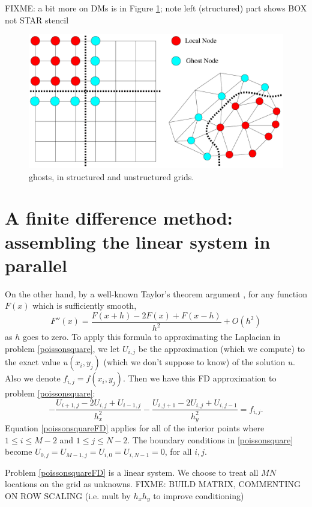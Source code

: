 FIXME: a bit more on DMs is in Figure \ref{fig:petscghostvalues}; note left (structured) part shows BOX not STAR stencil

\begin{figure}
\includegraphics[width=\textwidth]{petscghostvalues}
\caption{\PETSc ghosts, in structured and unstructured grids.}
\label{fig:petscghostvalues}
\end{figure}


\section{A finite difference method: assembling the linear system in parallel}

On the other hand, by a well-known Taylor's theorem argument \citep{MortonMayers}, for any function $F(x)$ which is sufficiently smooth,
    $$F''(x) = \frac{F(x+h) - 2 F(x) + F(x-h)}{h^2} + O(h^2)$$
as $h$ goes to zero.  To apply this formula to approximating the Laplacian in problem \eqref{poissonsquare}, we let $U_{i,j}$ be the approximation (which we compute) to the exact value $u(x_i,y_j)$ (which we don't suppose to know) of the solution $u$.  Also we denote $f_{i,j} = f(x_i,y_j)$.  Then we have this FD approximation to problem \eqref{poissonsquare}:
\begin{equation}
- \frac{U_{i+1,j} - 2 U_{i,j} + U_{i-1,j}}{h_x^2} - \frac{U_{i,j+1} - 2 U_{i,j} + U_{i,j-1}}{h_y^2} = f_{i,j}. \label{poissonsquareFD}
\end{equation}
Equation \eqref{poissonsquareFD} applies for all of the interior points where $1 \le i \le M-2$ and $1 \le j \le N-2$.  The boundary conditions in \eqref{poissonsquare} become $U_{0,j} = U_{M-1,j} = U_{i,0} = U_{i,N-1} = 0$, for all $i,j$.

Problem \eqref{poissonsquareFD} is a linear system.  We choose to treat all $MN$ locations on the grid as unknowns. FIXME: BUILD MATRIX, COMMENTING ON ROW SCALING (i.e. mult by $h_x h_y$ to improve conditioning)


